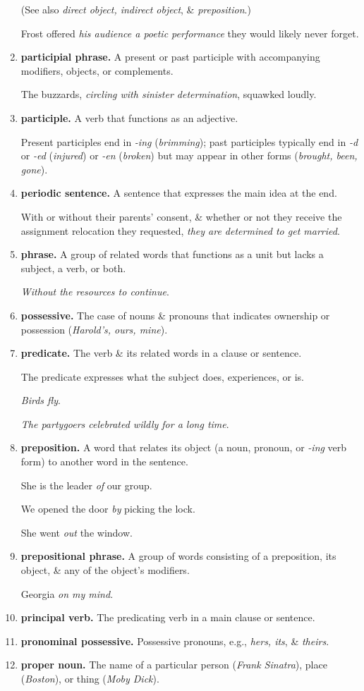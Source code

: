 \documentclass{article}
\begin{document}
\begin{enumerate}
	(See also {\it direct object, indirect object}, \& {\it preposition}.)
	
	Frost offered {\it his audience a poetic performance} they would likely never forget.
	\item {\bf participial phrase.} A present or past participle with accompanying modifiers, objects, or complements.
	
	The buzzards, {\it circling with sinister determination}, squawked loudly.
	\item {\bf participle.} A verb that functions as an adjective.
	
	Present participles end in {\it -ing} ({\it brimming}); past participles typically end in {\it -d} or {\it -ed} ({\it injured}) or {\it -en} ({\it broken}) but may appear in other forms ({\it brought, been, gone}).
	\item {\bf periodic sentence.} A sentence that expresses the main idea at the end.
	
	With or without their parents' consent, \& whether or not they receive the assignment relocation they requested, {\it they are determined to get married}.
	\item {\bf phrase.} A group of related words that functions as a unit but lacks a subject, a verb, or both.
	
	{\it Without the resources to continue}.
	\item {\bf possessive.} The case of nouns \& pronouns that indicates ownership or possession ({\it Harold's, ours, mine}).
	\item {\bf predicate.} The verb \& its related words in a clause or sentence.
	
	The predicate expresses what the subject does, experiences, or is.
	
	{\it Birds fly}.
	
	{\it The partygoers celebrated wildly for a long time}.
	\item {\bf preposition.} A word that relates its object (a noun, pronoun, or {\it -ing} verb form) to another word in the sentence.
	
	She is the leader {\it of} our group.
	
	We opened the door {\it by} picking the lock.
	
	She went {\it out} the window.
	\item {\bf prepositional phrase.} A group of words consisting of a preposition, its object, \& any of the object's modifiers.
	
	Georgia {\it on my mind}.
	\item {\bf principal verb.} The predicating verb in a main clause or sentence.
	\item {\bf pronominal possessive.} Possessive pronouns, e.g., {\it hers, its}, \& {\it theirs}.
	\item {\bf proper noun.} The name of a particular person ({\it Frank Sinatra}), place ({\it Boston}), or thing ({\it Moby Dick}).
	

\end{enumerate}
\end{document}

